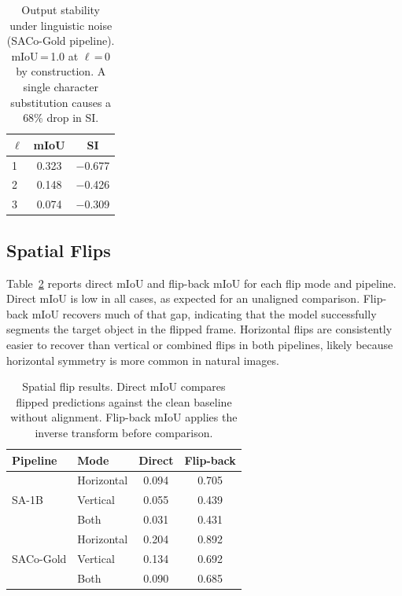 \documentclass[10pt,twocolumn,letterpaper]{article}
\begin{document}
\begin{table}[h]
\centering
\small
\begin{tabular}{lcc}
\hline
$\ell$ & mIoU & SI \\
\hline
1 & 0.323 & $-$0.677 \\
2 & 0.148 & $-$0.426 \\
3 & 0.074 & $-$0.309 \\
\hline
\end{tabular}
\vspace{3pt}
\caption{Output stability under linguistic noise (SACo-Gold pipeline).
         mIoU\,=\,1.0 at $\ell$\,=\,0 by construction.
         A single character substitution causes a 68\% drop in SI.}
\label{tab:text}
\end{table}


\subsection{Spatial Flips}
\label{sec:results-flips}

Table~\ref{tab:flips} reports direct mIoU and flip-back mIoU for each flip mode and pipeline. Direct mIoU
is low in all cases, as expected for an unaligned comparison.  Flip-back mIoU
recovers much of that gap, indicating that the model successfully segments the
target object in the flipped frame. Horizontal flips are consistently easier to recover than vertical or combined flips in both pipelines, likely
because horizontal symmetry is more common in natural images.

\begin{table}[h]
\centering
\small
\begin{tabular}{llcc}
\hline
Pipeline & Mode & Direct & Flip-back \\
\hline
\multirow{3}{*}{SA-1B}
  & Horizontal & 0.094 & 0.705 \\
  & Vertical   & 0.055 & 0.439 \\
  & Both       & 0.031 & 0.431 \\
\hline
\multirow{3}{*}{SACo-Gold}
  & Horizontal & 0.204 & 0.892 \\
  & Vertical   & 0.134 & 0.692 \\
  & Both       & 0.090 & 0.685 \\
\hline
\end{tabular}
\vspace{3pt}
\caption{Spatial flip results.  Direct mIoU compares flipped predictions against the clean baseline without alignment. Flip-back mIoU applies the inverse transform before comparison.}
\label{tab:flips}
\end{table}
\end{document}
